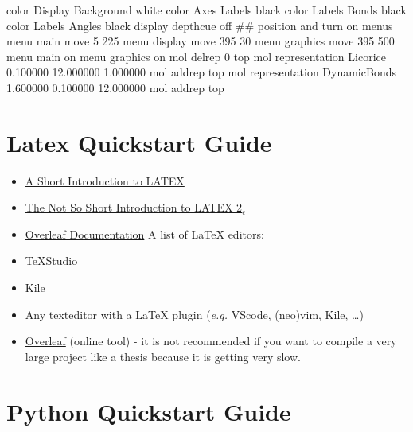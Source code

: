 \documentclass[
  letterpaper,
]{article}
\newenvironment{Shaded}{\begin{snugshade}}{\end{snugshade}}
\newcommand{\CommentTok}[1]{\textcolor[rgb]{0.37,0.37,0.37}{#1}}
\newcommand{\DecValTok}[1]{\textcolor[rgb]{0.68,0.00,0.00}{#1}}
\newcommand{\FloatTok}[1]{\textcolor[rgb]{0.68,0.00,0.00}{#1}}
\newcommand{\NormalTok}[1]{\textcolor[rgb]{0.00,0.23,0.31}{#1}}
\begin{document}
\begin{Shaded}
\begin{Highlighting}[]
\NormalTok{    color Display Background white}
\NormalTok{    color Axes Labels black}
\NormalTok{    color Labels Bonds black}
\NormalTok{    color Labels Angles black}
\NormalTok{    display depthcue off}
    \CommentTok{\#\# position and turn on menus}
\NormalTok{    menu main move }\DecValTok{5} \DecValTok{225}
\NormalTok{    menu display move }\DecValTok{395} \DecValTok{30}
\NormalTok{    menu graphics move }\DecValTok{395} \DecValTok{500}
\NormalTok{    menu main on}
\NormalTok{    menu graphics on}
\NormalTok{    mol delrep }\DecValTok{0}\NormalTok{ top}
\NormalTok{    mol representation Licorice }\FloatTok{0.100000} \FloatTok{12.000000} \FloatTok{1.000000}
\NormalTok{    mol addrep top}
\NormalTok{    mol representation DynamicBonds }\FloatTok{1.600000} \FloatTok{0.100000} \FloatTok{12.000000}
\NormalTok{    mol addrep top}
\end{Highlighting}
\end{Shaded}

\hypertarget{latex-quickstart-guide}{%
\section{Latex Quickstart Guide}\label{latex-quickstart-guide}}

\begin{itemize}
\item
  \href{http://www.math.uco.edu/pages/rwilliams/math3183-fall2018/Short_LaTeX_Intro.pdf}{A
  Short Introduction to LATEX}
\item
  \href{https://tobi.oetiker.ch/lshort/lshort.pdf}{The Not So Short
  Introduction to LATEX 2\(_\epsilon\)}
\item
  \href{https://de.overleaf.com/learn}{Overleaf Documentation} A list of
  LaTeX editors:\\
\item
  TeXStudio
\item
  Kile
\item
  Any texteditor with a LaTeX plugin (\emph{e.g.} VScode, (neo)vim,
  Kile, \ldots)
\item
  \href{https://de.overleaf.com/}{Overleaf} (online tool) - it is not
  recommended if you want to compile a very large project like a thesis
  because it is getting very slow.
\end{itemize}

\hypertarget{python-quickstart-guide}{%
\section{Python Quickstart Guide}\label{python-quickstart-guide}}
\end{document}
